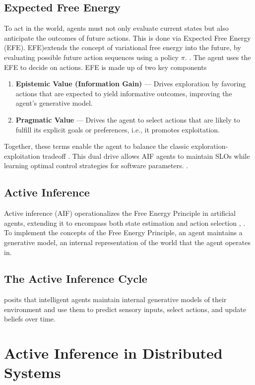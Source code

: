  \subsection{Expected Free Energy}
To act in the world, agents must not only evaluate current states but also anticipate the outcomes of future actions. This is done via Expected Free Energy (EFE). EFE)extends the concept of variational free energy into the future, by evaluating possible future action sequences using a policy \(\pi\). \cite{friston_active_2016}. The agent uses the EFE to decide on actions. EFE is made up of two key components \cite{friston_active_2022} %
\begin{enumerate}
  \item \textbf{Epistemic Value (Information Gain)} — Drives exploration by favoring actions that are expected to yield informative outcomes, improving the agent’s generative model.
  \item \textbf{Pragmatic Value} — Drives the agent to select actions that are likely to fulfill its explicit goals or preferences, i.e., it promotes exploitation.
\end{enumerate}

Together, these terms enable the agent to balance the classic exploration-exploitation tradeoff \cite{sedlak_adaptive_2024}. This dual drive allows AIF
agents to maintain SLOs while learning optimal control strategies for software parameters. \cite{lapkovskis_benchmarking_2025}.

\subsection{Active Inference}
Active inference (AIF) operationalizes the Free Energy Principle in artificial agents, extending it to encompass both state estimation and action selection \cite{lanillos_active_2021}, \cite{sedlak_equilibrium_2024}. To implement the concepts of the Free Energy Principle, an agent maintains a generative model, an internal representation of the world that the agent operates in. 



\subsection{The Active Inference Cycle}




posits that intelligent agents maintain internal generative models of
their environment and use them to predict sensory inputs, select actions, and update beliefs
over time. 

\section{Active Inference in Distributed Systems}

